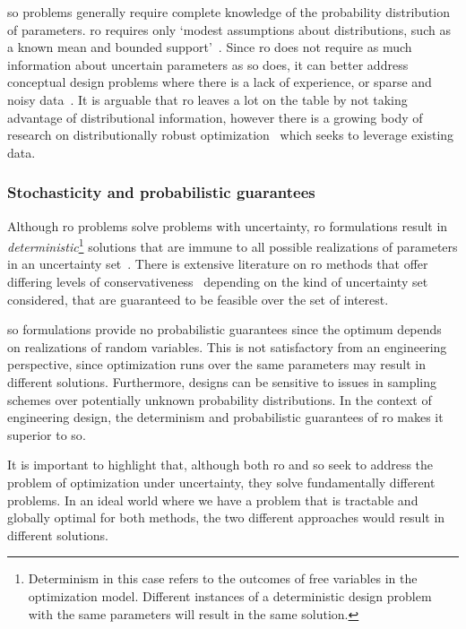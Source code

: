 \gls{so} problems generally require complete knowledge of the probability distribution of
parameters.
\gls{ro} requires only `modest assumptions  about distributions, such as a known mean and
bounded support'~\cite{Chen2007}. Since \gls{ro} does not require as much information
about uncertain parameters as \gls{so} does, it can better address conceptual design problems where there
is a lack of experience, or sparse and noisy data~\cite{Bertsimas2011}. It is arguable that \gls{ro}
leaves a lot on the table by not taking advantage of distributional information,
however there is a growing body of research on distributionally robust optimization~\cite{Bertsimas2017}
which seeks to leverage existing data.

\subsubsection{Stochasticity and probabilistic guarantees}

Although \gls{ro} problems solve problems with uncertainty,
\gls{ro} formulations result in \emph{deterministic}\footnote{Determinism in this case
refers to the outcomes of free variables in the optimization model.
Different instances of a deterministic design problem with
the same parameters will result in the same solution.} solutions that are immune
to all possible realizations of parameters in an uncertainty set~\cite{Bertsimas2011}.
There is extensive literature on \gls{ro} methods
that offer differing levels of conservativeness~\cite{Bertsimas2004}
depending on the kind of uncertainty set considered, that are guaranteed
to be feasible over the set of interest.

\gls{so} formulations provide no probabilistic guarantees
since the optimum depends on realizations of random variables\cite{Shmoys2004}.
This is not satisfactory from an engineering perspective, since
optimization runs over the same parameters may result in different
solutions. Furthermore, designs
can be sensitive to issues in sampling schemes over potentially unknown
probability distributions. In the context of engineering design, the determinism
and probabilistic guarantees of \gls{ro} makes
it superior to \gls{so}.

It is important to highlight that,
although both \gls{ro} and \gls{so} seek to address the problem
of optimization under uncertainty, they solve fundamentally different problems. In an ideal world where
we have a problem that is tractable and globally optimal for both methods, the two different
approaches would result in different solutions.

